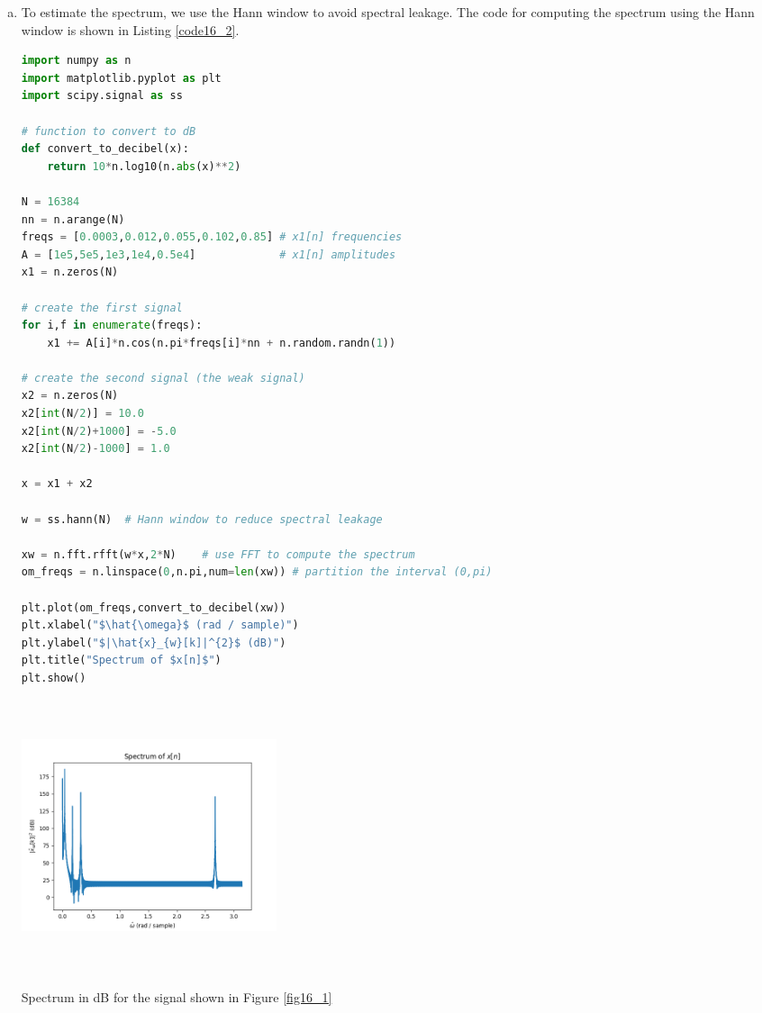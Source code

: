 \begin{enumerate}
\begin{enumerate}[a)]
\item To estimate the spectrum, we use the Hann window to avoid spectral leakage. 
The code for computing the spectrum using the Hann window is shown in Listing \ref{code16_2}.

\begin{lstlisting}[language=Python, caption=Spectrum for noisy signal in Figure \ref{fig16_1},label=code16_2]
import numpy as n
import matplotlib.pyplot as plt
import scipy.signal as ss

# function to convert to dB
def convert_to_decibel(x):
    return 10*n.log10(n.abs(x)**2)
    
N = 16384
nn = n.arange(N)
freqs = [0.0003,0.012,0.055,0.102,0.85] # x1[n] frequencies
A = [1e5,5e5,1e3,1e4,0.5e4]             # x1[n] amplitudes
x1 = n.zeros(N)

# create the first signal
for i,f in enumerate(freqs):
    x1 += A[i]*n.cos(n.pi*freqs[i]*nn + n.random.randn(1))

# create the second signal (the weak signal)
x2 = n.zeros(N)
x2[int(N/2)] = 10.0
x2[int(N/2)+1000] = -5.0
x2[int(N/2)-1000] = 1.0

x = x1 + x2

w = ss.hann(N)  # Hann window to reduce spectral leakage

xw = n.fft.rfft(w*x,2*N)    # use FFT to compute the spectrum
om_freqs = n.linspace(0,n.pi,num=len(xw)) # partition the interval (0,pi)

plt.plot(om_freqs,convert_to_decibel(xw))
plt.xlabel("$\hat{\omega}$ (rad / sample)")
plt.ylabel("$|\hat{x}_{w}[k]|^{2}$ (dB)")
plt.title("Spectrum of $x[n]$")
plt.show()
\end{lstlisting}

\begin{marginfigure}
    \centering
    \includegraphics[width=7.5cm,height=8.0cm]{ch17/figures/ex16_2.png}
    \caption{Spectrum in dB for the signal shown in Figure \ref{fig16_1}}
    \label{fig16_2}
\end{marginfigure}


\end{enumerate}
\end{enumerate}
